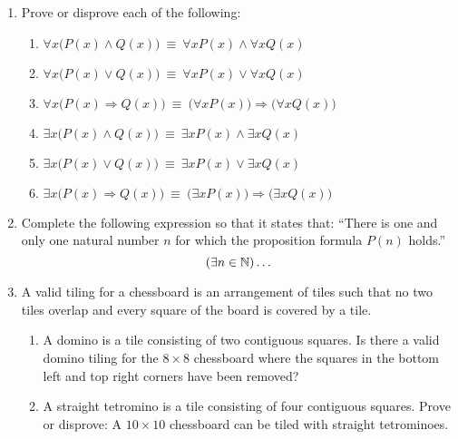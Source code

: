 \documentclass[11pt]{article}
\begin{document}
\begin{enumerate}
\item Prove or disprove each of the following:
\begin{enumerate}
\item $\forall x \bigl( P(x) \wedge Q(x) \bigr)~\equiv~\forall x P(x) \wedge \forall x Q(x)$
\item $\forall x \bigl( P(x) \vee Q(x) \bigr)~\equiv~\forall x P(x) \vee \forall x Q(x)$
\item $\forall x \bigl( P(x) \Rightarrow Q(x) \bigr)~\equiv~\bigl( \forall x P(x) \bigr) \Rightarrow \bigl( \forall x Q(x) \bigr)$
\item $\exists x \bigl( P(x) \wedge Q(x) \bigr)~\equiv~\exists x P(x) \wedge \exists x Q(x)$
\item $\exists x \bigl( P(x) \vee Q(x) \bigr)~\equiv~\exists x P(x) \vee \exists x Q(x)$
\item $\exists x \bigl( P(x) \Rightarrow Q(x) \bigr)~\equiv~\bigl( \exists x P(x) \bigr) \Rightarrow \bigl( \exists x Q(x) \bigr)$
\end{enumerate}

\item Complete the following expression so that it states that: ``There is one
  and only one natural number $n$ for which the proposition formula $P(n)$
  holds.''
  \[ (\exists n\in \mathbb{N}) \dots \]

\item A valid tiling for a chessboard is an arrangement of tiles such that no two tiles overlap and every square of the board is covered by a tile.
\begin{enumerate}
\item A domino is a tile consisting of two contiguous squares. Is there a valid domino tiling for the $8 \times 8$ chessboard where the squares in the bottom left and top right corners have been removed?
\item A straight tetromino is a tile consisting of four contiguous squares. Prove or disprove: A $10 \times 10$ chessboard can be tiled with straight tetrominoes.
\end{enumerate}

\end{enumerate}
\end{document}
